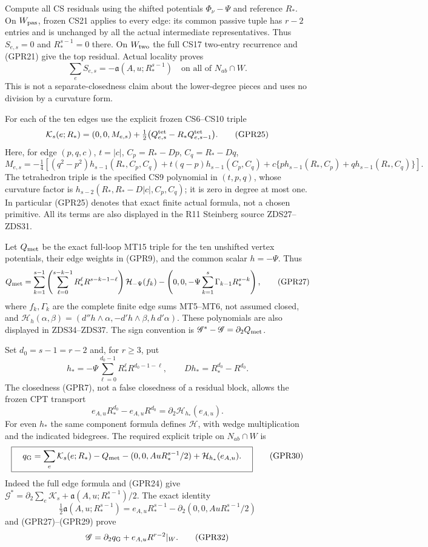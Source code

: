 Compute all CS residuals using the shifted potentials
$\Phi_\nu-\Psi$ and reference $R_*$.  On $W_{\rm pas}$,
frozen CS21 applies to every edge: its common passive tuple has
$r-2$ entries and is unchanged by all the actual intermediate
representatives.  Thus $S_{e,s}=0$ and $R_*^{s-1}=0$ there.
On $W_{\rm two}$ the full CS17 two-entry recurrence and (GPR21)
give the top residual.  Actual locality proves
\[
                  \sum_eS_{e,s}=-\mathfrak a(A,u;R_*^{s-1})
                   \quad\text{on all of }N_{ab}\cap W.
 \tag{GPR24}
\]
This is not a separate-closedness claim about the lower-degree
pieces and uses no division by a curvature form.

For each of the ten edges use the explicit frozen CS6--CS10
triple
\[
 \mathcal K_s(e;R_*)=(0,0,M_{e,s})
       +\tfrac12\bigl(Q^{\rm tet}_{e,s}-R_*Q^{\rm tet}_{e,s-1}\bigr).
 \tag{GPR25}
\]
Here, for edge $(p,q,c)$, $t=|c|$, $C_p=R_*-Dp$, $C_q=R_*-Dq$,
\[
 M_{e,s}=-\tfrac14\left[
 (q^2-p^2)h_{s-1}(R_*,C_p,C_q)
 +t(q-p)h_{s-1}(C_p,C_q)
 +c\{p h_{s-1}(R_*,C_p)+q h_{s-1}(R_*,C_q)\}\right].
 \tag{GPR26}
\]
The tetrahedron triple is the specified CS9 polynomial in
$(t,p,q)$, whose curvature factor is
$h_{s-2}(R_*,R_*-D|c|,C_p,C_q)$; it is zero in degree at
most one.  In particular (GPR25) denotes that exact finite actual
formula, not a chosen primitive.  All its terms are also displayed
in the R11 Steinberg source ZDS27--ZDS31.

Let $Q_{\rm met}$ be the exact full-loop MT15 triple for the
ten unshifted vertex potentials, their edge weights in (GPR9),
and the common scalar $h=-\Psi$.  Thus
\[
 Q_{\rm met}=
 \sum_{k=1}^{s-1}\left(\sum_{\ell=0}^{s-k-1}R_*^\ell R^{s-k-1-\ell}\right)
     \mathcal H_{-\Psi}(f_k)
 -\left(0,0,-\Psi\sum_{k=1}^s\Gamma_{k-1}R_*^{s-k}\right),
 \tag{GPR27}
\]
where $f_k,\Gamma_k$ are the complete finite edge sums MT5--MT6,
not assumed closed, and
$\mathcal H_h(\alpha,\beta)=(d''h\wedge\alpha,-d'h\wedge\beta,h\,d'\alpha)$.
These polynomials are also displayed in ZDS34--ZDS37.  The sign
convention is $\mathscr G^*-\mathscr G=\partial_2Q_{\rm met}$.

Set $d_0=s-1=r-2$ and, for $r\ge3$, put
\[
 h_*=-\Psi\sum_{\ell=0}^{d_0-1}R_*^\ell R^{d_0-1-\ell},
 \qquad Dh_*=R_*^{d_0}-R^{d_0}.
 \tag{GPR28}
\]
The closedness (GPR7), not a false closedness of a residual block,
allows the frozen CPT transport
\[
 e_{A,u}R_*^{d_0}-e_{A,u}R^{d_0}
                     =\partial_2\mathcal H_{h_*}(e_{A,u}).
 \tag{GPR29}
\]
For even $h_*$ the same component formula defines $\mathcal H$,
with wedge multiplication and the indicated bidegrees.
The required explicit triple on $N_{ab}\cap W$ is
\[
 \boxed{\quad
 q_{\rm G}=
 \sum_e\mathcal K_s(e;R_*)-Q_{\rm met}
 -(0,0,Au R_*^{s-1}/2)+\mathcal H_{h_*}(e_{A,u}).
 \quad}
 \tag{GPR30}
\]
Indeed the full edge formula and (GPR24) give
$\mathscr G^*=\partial_2\sum_e\mathcal K_s
 +\mathfrak a(A,u;R_*^{s-1})/2$.
The exact identity
\[
 \tfrac12\mathfrak a(A,u;R_*^{s-1})
 =e_{A,u}R_*^{s-1}-\partial_2(0,0,AuR_*^{s-1}/2)
 \tag{GPR31}
\]
and (GPR27)--(GPR29) prove
\[
                \mathscr G=\partial_2q_{\rm G}
                                      +e_{A,u}R^{r-2}|_W.
 \tag{GPR32}
\]

